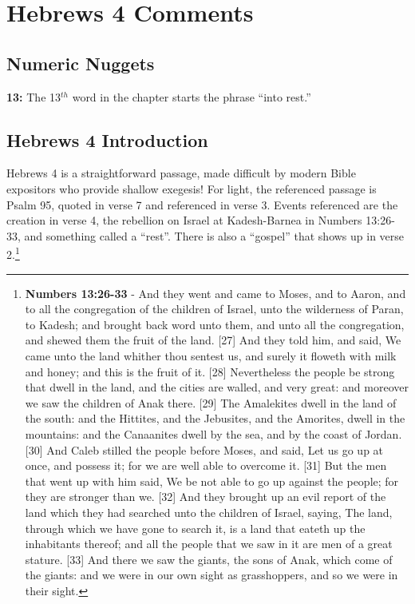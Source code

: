 \section{Hebrews 4 Comments}

\subsection{Numeric Nuggets}
\textbf{13:} The 13$^{th}$ word in the chapter starts the phrase ``into rest.''

\subsection{Hebrews 4 Introduction}

Hebrews 4 is a straightforward passage, made difficult by modern Bible expositors who provide shallow exegesis! For light, the referenced passage is Psalm 95, quoted in verse 7 and referenced  in verse 3. Events referenced are the creation in verse 4, the rebellion on Israel at Kadesh-Barnea in Numbers 13:26-33, and something called a ``rest''. There is also a ``gospel'' that shows up in verse 2.\footnote{\textbf{Numbers 13:26-33} - And they went and came to Moses, and to Aaron, and to all the congregation of the children of Israel, unto the wilderness of Paran, to Kadesh; and brought back word unto them, and unto all the congregation, and shewed them the fruit of the land. [27] And they told him, and said, We came unto the land whither thou sentest us, and surely it floweth with milk and honey; and this is the fruit of it. [28] Nevertheless the people be strong that dwell in the land, and the cities are walled, and very great: and moreover we saw the children of Anak there. [29] The Amalekites dwell in the land of the south: and the Hittites, and the Jebusites, and the Amorites, dwell in the mountains: and the Canaanites dwell by the sea, and by the coast of Jordan. [30] And Caleb stilled the people before Moses, and said, Let us go up at once, and possess it; for we are well able to overcome it. [31] But the men that went up with him said, We be not able to go up against the people; for they are stronger than we. [32] And they brought up an evil report of the land which they had searched unto the children of Israel, saying, The land, through which we have gone to search it, is a land that eateth up the inhabitants thereof; and all the people that we saw in it are men of a great stature. [33] And there we saw the giants, the sons of Anak, which come of the giants: and we were in our own sight as grasshoppers, and so we were in their sight.}

